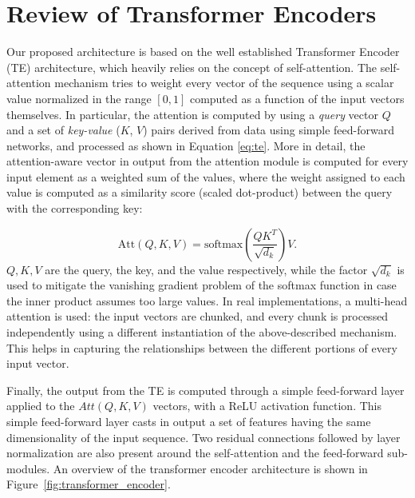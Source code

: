 \documentclass[acmsmall]{acmart}
\newcommand{\majorrevised}[1]{#1}
\begin{document}
\section{Review of Transformer Encoders}
\label{sec:te}
Our proposed architecture is based on the well established Transformer Encoder (TE) architecture, which heavily relies on the concept of self-attention.
The self-attention mechanism tries to weight every vector of the sequence using a scalar value normalized in the range $[0, 1]$ computed as a function of the input vectors themselves. In particular, the attention is computed by using a \textit{query} vector $Q$ and a set of \textit{key-value} ($K$, $V$) pairs derived from data using simple feed-forward networks, and processed as shown in Equation \ref{eq:te}. More in detail, the attention-aware vector in output from the attention module is computed for every input element as a weighted sum of the values, where the weight assigned to each value is computed as a similarity score (scaled dot-product) between the query with the corresponding key:





\begin{equation}
\label{eq:te}
    \text{Att}(Q, K, V) = \text{softmax} \left( \frac{QK^T}{\sqrt{d_k}}\right)V.
\end{equation}
$Q, K, V$ are the query, the key, and the value respectively, while the factor $\sqrt{d_k}$ is used to mitigate the vanishing gradient problem of the softmax function in case the inner product assumes too large values. \majorrevised {In real implementations, a multi-head attention is used: the input vectors are chunked, and every chunk is processed independently using a different instantiation of the above-described mechanism. This helps in capturing the relationships between the different portions of every input vector.}





Finally, the output from the TE is computed through a simple feed-forward layer applied to the $Att(Q, K, V)$ vectors, with a ReLU activation function. This simple feed-forward layer casts in output a set of features having the same dimensionality of the input sequence. Two residual connections followed by layer normalization are also present around the self-attention and the feed-forward sub-modules. \majorrevised{An overview of the transformer encoder architecture is shown in Figure~\ref{fig:transformer_encoder}}.
\end{document}
